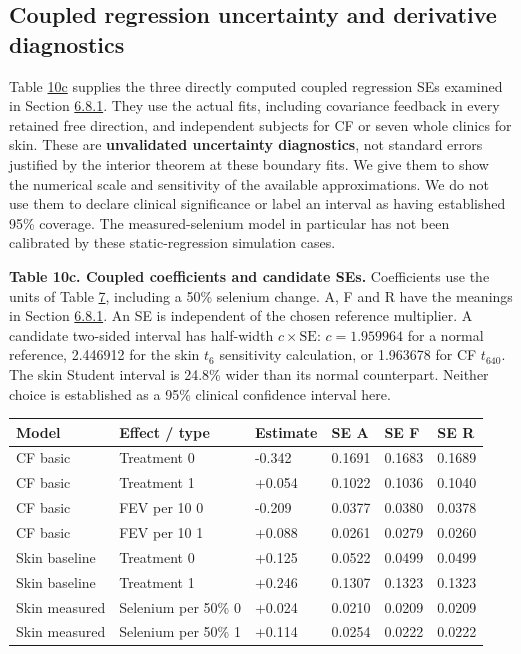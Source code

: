 \documentclass[11pt]{article}
\begin{document}
\subsection{Coupled regression uncertainty and derivative diagnostics}\label{sec:7.6}

Table \hyperref[tab:10c]{10c} supplies the three directly computed coupled regression SEs examined in Section \hyperref[sec:6.8.1]{6.8.1}. They use the actual fits, including covariance feedback in every retained free direction, and independent subjects for CF or seven whole clinics for skin. These are \textbf{unvalidated uncertainty diagnostics}, not standard errors justified by the interior theorem at these boundary fits. We give them to show the numerical scale and sensitivity of the available approximations. We do not use them to declare clinical significance or label an interval as having established 95\% coverage. The measured-selenium model in particular has not been calibrated by these static-regression simulation cases.

\label{tab:10c}
\textbf{Table 10c. Coupled coefficients and candidate SEs.} Coefficients use the units of Table \hyperref[tab:7]{7}, including a 50\% selenium change. A, F and R have the meanings in Section \hyperref[sec:6.8.1]{6.8.1}. An SE is independent of the chosen reference multiplier. A candidate two-sided interval has half-width \(c\times\mathrm{SE}\): \(c=1.959964\) for a normal reference, 2.446912 for the skin \(t_6\) sensitivity calculation, or 1.963678 for CF \(t_{640}\). The skin Student interval is 24.8\% wider than its normal counterpart. Neither choice is established as a 95\% clinical confidence interval here.

{
\begin{longtable}{llllll}
\toprule
\textbf{Model} & \textbf{Effect / type} & \textbf{Estimate} & \textbf{SE A} & \textbf{SE F} & \textbf{SE R} \\
\midrule
\endhead
\bottomrule
\endlastfoot
CF basic & Treatment 0 & -0.342 & 0.1691 & 0.1683 & 0.1689 \\
CF basic & Treatment 1 & +0.054 & 0.1022 & 0.1036 & 0.1040 \\
CF basic & FEV per 10 0 & -0.209 & 0.0377 & 0.0380 & 0.0378 \\
CF basic & FEV per 10 1 & +0.088 & 0.0261 & 0.0279 & 0.0260 \\
Skin baseline & Treatment 0 & +0.125 & 0.0522 & 0.0499 & 0.0499 \\
Skin baseline & Treatment 1 & +0.246 & 0.1307 & 0.1323 & 0.1323 \\
Skin measured & Selenium per 50\% 0 & +0.024 & 0.0210 & 0.0209 & 0.0209 \\
Skin measured & Selenium per 50\% 1 & +0.114 & 0.0254 & 0.0222 & 0.0222 \\
\end{longtable}}
\end{document}
